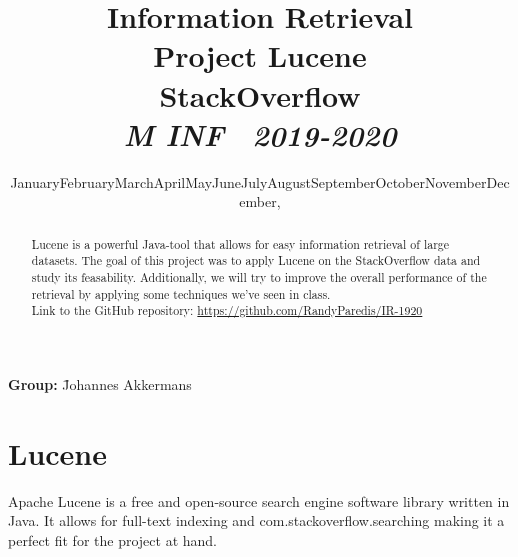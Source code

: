 \documentclass[11pt]{article}
\renewcommand{\today}{\ifcase \month \or January\or February\or March\or April\or May\or June\or July\or August\or September\or October\or November\or December\fi, \number \year}
\newcommand{\topic}{Project Lucene}
\newcommand{\paper}{StackOverflow\\
	\small{\textit{M INF \  2019-2020}}
}
\newcommand{\team}{
	\=Johannes Akkermans%
}
\begin{document}
\title{\textmd{\textbf{Information Retrieval}}\\\normalsize\vspace{0.1in}\Large{\topic}\\\large{\paper}\Large\\\vspace{0.1in}}
\author{}
\date{\today}
\maketitle
\begin{center}
	\parbox{0cm}{
		\begin{tabbing}
		\textbf{Group:} \team
		\end{tabbing}
	}
\end{center}

\vspace*{1em}

\begin{abstract}
	\noindent
    Lucene is a powerful Java-tool that allows for easy information retrieval of large datasets. The goal of this project was to apply Lucene on the StackOverflow data and study its feasability. Additionally, we will try to improve the overall performance of the retrieval by applying some techniques we've seen in class.\\
    
    \noindent
    Link to the GitHub repository: \url{https://github.com/RandyParedis/IR-1920}
\end{abstract}

\newpage


\section{Lucene}\label{sec:lucene}
Apache Lucene is a free and open-source search engine software library written in Java. It allows for full-text indexing and com.stackoverflow.searching making it a perfect fit for the project at hand. \cite{lucene-wiki}
\end{document}
